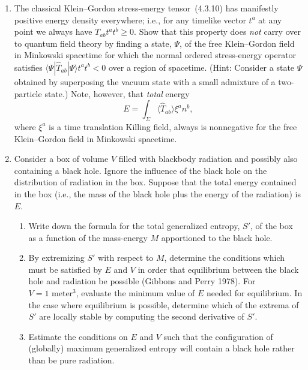 \begin{enumerate}[label=\arabic*.,leftmargin=2em,itemsep=1.2ex]
\item
The classical Klein--Gordon stress-energy tensor~(4.3.10) has manifestly positive
energy density everywhere; i.e., for any timelike vector \(t^a\) at any point we
always have \(T_{ab}t^at^b\geq0\). Show that this property does \emph{not} carry
over to quantum field theory by finding a state, \(\Psi\), of the free Klein--Gordon
field in Minkowski spacetime for which the normal ordered stress-energy operator
satisfies \(\langle\Psi|\widehat T_{ab}|\Psi\rangle t^at^b<0\) over a region of
spacetime. (Hint: Consider a state \(\Psi\) obtained by superposing the vacuum state
with a small admixture of a two-particle state.) Note, however, that \emph{total}
energy
\[
  E=\int_\Sigma\langle\widehat T_{ab}\rangle\xi^a n^b,
\]
where \(\xi^a\) is a time translation Killing field, always is nonnegative for the free
Klein--Gordon field in Minkowski spacetime.

\item
Consider a box of volume \(V\) filled with blackbody radiation and possibly also
containing a black hole. Ignore the influence of the black hole on the distribution of
radiation in the box. Suppose that the total energy contained in the box (i.e., the mass
of the black hole plus the energy of the radiation) is \(E\).
\begin{enumerate}[label=\alph*),leftmargin=2em,itemsep=.45ex]
\item Write down the formula for the total generalized entropy, \(S'\), of the box as
a function of the mass-energy \(M\) apportioned to the black hole.
\item By extremizing \(S'\) with respect to \(M\), determine the conditions which
must be satisfied by \(E\) and \(V\) in order that equilibrium between the black hole
and radiation be possible (Gibbons and Perry 1978). For \(V=1\text{ meter}^3\),
evaluate the minimum value of \(E\) needed for equilibrium. In the case where
equilibrium is possible, determine which of the extrema of \(S'\) are locally stable by
computing the second derivative of \(S'\).
\item Estimate the conditions on \(E\) and \(V\) such that the configuration of
(globally) maximum generalized entropy will contain a black hole rather than be pure
radiation.
\end{enumerate}
\end{enumerate}
